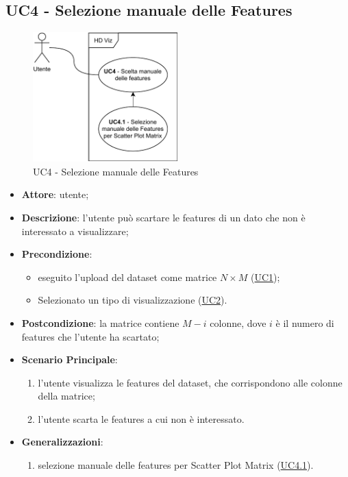 \subsection{UC4 - Selezione manuale delle Features}
\label{uc4}

    \begin{figure}[htbp]
        \centering
        \includegraphics[width=0.5\textwidth]{source/sections/casi-uso/diagrams/uc4.pdf}
        \caption{UC4 - Selezione manuale delle Features}
        \label{fig:uc4}
    \end{figure}
    
    \begin{itemize}
    \item \textbf{Attore}: utente;
    \item \textbf{Descrizione}: l'utente può scartare le features di un dato che non è interessato a visualizzare;
    \item \textbf{Precondizione}: 
     \begin{itemize}
        \item eseguito l'upload del dataset come matrice $N\times M$ (\hyperref[uc1]{UC1});
        \item Selezionato un tipo di visualizzazione (\hyperref[uc2]{UC2}).
    \end{itemize}
    \item \textbf{Postcondizione}: la matrice contiene $M-i$ colonne, dove $i$ è il numero di features che l'utente ha scartato;
    \item \textbf{Scenario Principale}: 
    \begin{enumerate}
        \item l'utente visualizza le features del dataset, che corrispondono alle colonne della matrice;
        \item l'utente scarta le features a cui non è interessato.
    \end{enumerate}
    \item \textbf{Generalizzazioni}:
        \begin{enumerate}
            \item selezione manuale delle features per Scatter Plot Matrix (\hyperref[uc4.1]{UC4.1}).
        \end{enumerate}
    \end{itemize}
    

